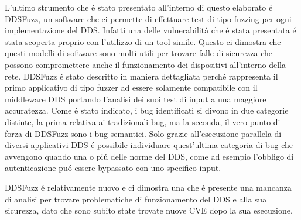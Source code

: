 L'ultimo strumento che é stato presentato all'interno di questo 
elaborato é DDSFuzz, un software che ci permette di effettuare test 
di tipo fuzzing per ogni implementazione del DDS. Infatti una delle 
vulnerabilità che é stata presentata é stata scoperta proprio 
con l'utilizzo di un tool simile. Questo ci dimostra che questi 
modelli di software sono molti utili per trovare falle di sicurezza 
che possono compromettere anche il funzionamento dei dispositivi
all'interno della rete. DDSFuzz é stato descritto in maniera dettagliata
perché rappresenta il primo applicativo di tipo fuzzer ad essere
solamente  
compatibile con il middleware DDS portando l'analisi dei suoi test di 
input a una maggiore accuratezza. Come é stato indicato, i bug identificati
si divono in due categorie distinte, la prima relativa ai tradizionali 
bug, ma la seconda, il vero punto di forza di DDSFuzz sono i bug semantici.
Solo grazie all'esecuzione parallela di diversi applicativi DDS é possibile
individuare quest'ultima categoria di bug che avvengono quando 
una o piú delle norme del DDS, come ad esempio l'obbligo di 
autenticazione puó essere bypassato con uno specifico input.

DDSFuzz é relativamente nuovo e ci dimostra una che é presente 
una mancanza di analisi per trovare problematiche di funzionamento
del DDS e alla sua sicurezza, dato che sono subito state trovate 
nuove CVE dopo la sua esecuzione. 



